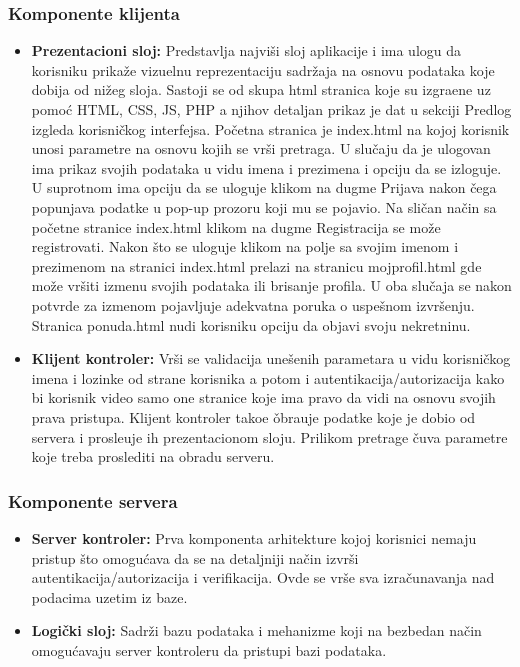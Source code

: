 \documentclass[20pt]{article}
\begin{document}
 
\subsubsection{\bfseries \Large Komponente klijenta }
\setlength{\parindent}{1cm}
\fontsize{13}{18} \selectfont 
\begin{itemize}
    \item \textbf{Prezentacioni sloj:} Predstavlja najvi\v {s}i sloj aplikacije i ima ulogu da korisniku prika\v {z}e vizuelnu reprezentaciju sadr\v {z}aja na osnovu podataka koje dobija od ni\v {z}eg sloja. Sastoji se od skupa html stranica koje su izgra\dj ene uz pomo\' c HTML, CSS, JS, PHP a njihov detaljan prikaz je dat u sekciji Predlog izgleda korisni\v {c}kog interfejsa. Po\v {c}etna stranica je index.html na kojoj korisnik unosi parametre na osnovu kojih se vr\v {s}i pretraga. U slu\v {c}aju da je ulogovan ima prikaz svojih podataka u vidu imena i prezimena i opciju da se izloguje. U suprotnom ima opciju da se uloguje klikom na dugme Prijava nakon \v {c}ega popunjava podatke u pop-up prozoru koji mu se pojavio. Na sli\v {c}an na\v {c}in sa po\v {c}etne stranice index.html klikom na dugme Registracija se mo\v {z}e registrovati. Nakon \v {s}to se uloguje klikom na polje sa svojim imenom i prezimenom na stranici index.html prelazi na stranicu mojprofil.html gde mo\v {z}e vr\v {s}iti izmenu svojih podataka ili brisanje profila. U oba slu\v {c}aja se nakon potvrde za izmenom pojavljuje adekvatna poruka o uspe\v {s}nom izvr\v {s}enju. Stranica ponuda.html nudi korisniku opciju da objavi svoju nekretninu. 
    \item \textbf{Klijent kontroler:} Vr\v {s}i se validacija une\v {s}enih parametara u vidu korisni\v {c}kog imena i lozinke od strane korisnika a potom i autentikacija/autorizacija kako bi korisnik video samo one stranice koje ima pravo da vidi na osnovu svojih prava pristupa. Klijent kontroler tako\dj e \v obra\dj uje podatke koje je dobio od servera i prosle\dj uje ih prezentacionom sloju. Prilikom pretrage \v {c}uva parametre koje treba proslediti na obradu serveru.
\end{itemize}
      
            
\subsubsection{\bfseries \Large Komponente servera }
\setlength{\parindent}{1cm}
\fontsize{13}{18} \selectfont       
\begin{itemize}
    \item \textbf{Server kontroler:} Prva komponenta arhitekture kojoj korisnici nemaju pristup \v {s}to omogu\' cava da se na detaljniji na\v {c}in izvr\v {s}i autentikacija/autorizacija i verifikacija. Ovde se vr\v {s}e sva izra\v {c}unavanja nad podacima uzetim iz baze.
    \item \textbf{Logi\v {c}ki sloj:} Sadr\v {z}i bazu podataka i mehanizme koji na bezbedan na\v {c}in omogu\' cavaju server kontroleru da pristupi bazi podataka.
\end{itemize}
\end{document}
